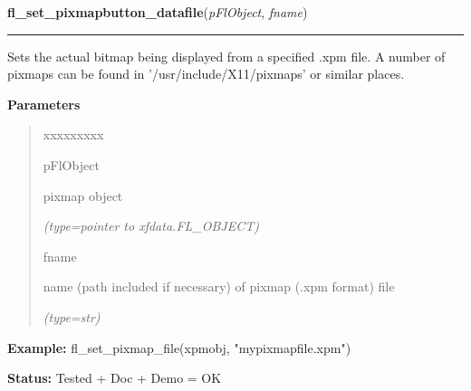 \hspace{.8\funcindent}\begin{boxedminipage}{\funcwidth}

    \raggedright \textbf{fl\_set\_pixmapbutton\_datafile}(\textit{pFlObject}, \textit{fname})

    \vspace{-1.5ex}

    \rule{\textwidth}{0.5\fboxrule}
\setlength{\parskip}{2ex}
    Sets the actual bitmap being displayed from a specified .xpm file. A 
    number of pixmaps can be found in '/usr/include/X11/pixmaps' or similar
    places.

\setlength{\parskip}{1ex}
      \textbf{Parameters}
      \vspace{-1ex}

      \begin{quote}
        \begin{Ventry}{xxxxxxxxx}

          \item[pFlObject]

          pixmap object

            {\it (type=pointer to xfdata.FL\_OBJECT)}

          \item[fname]

          name (path included if necessary) of pixmap (.xpm format) file

            {\it (type=str)}

        \end{Ventry}

      \end{quote}

\textbf{Example:} fl\_set\_pixmap\_file(xpmobj, "mypixmapfile.xpm")



\textbf{Status:} Tested + Doc + Demo = OK



    \end{boxedminipage}

    \label{xformslib:flbitmap:fl_set_pixmap_align}

    \vspace{0.5ex}


